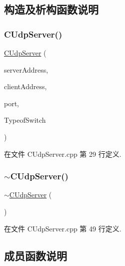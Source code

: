 \subsection{构造及析构函数说明}
\mbox{\label{class_c_udp_server_a19041db501fb138a97d3b492f8f2ab10}} 
\subsubsection{\texorpdfstring{C\+Udp\+Server()}{CUdpServer()}}
{\footnotesize\ttfamily \hyperlink{class_c_udp_server}{C\+Udp\+Server} (\begin{DoxyParamCaption}\item[{const char $\ast$}]{server\+Address,  }\item[{const char $\ast$}]{client\+Address,  }\item[{int}]{port,  }\item[{\hyperlink{_c_udp_server_8h_a41273fdeb63230b3a5c360d8c7c11b82}{S\+W\+I\+T\+C\+H\+\_\+\+T\+Y\+PE}}]{Typeof\+Switch }\end{DoxyParamCaption})}



在文件 C\+Udp\+Server.\+cpp 第 29 行定义.

\mbox{\label{class_c_udp_server_a541cb9eac44794602e78217e636910b6}} 
\subsubsection{\texorpdfstring{$\sim$\+C\+Udp\+Server()}{~CUdpServer()}}
{\footnotesize\ttfamily $\sim$\hyperlink{class_c_udp_server}{C\+Udp\+Server} (\begin{DoxyParamCaption}{ }\end{DoxyParamCaption})\hspace{0.3cm}{\ttfamily [virtual]}}



在文件 C\+Udp\+Server.\+cpp 第 49 行定义.



\subsection{成员函数说明}
\mbox{\label{class_c_udp_server_a1cedc8de6419884c89f5731d189175c8}} 
